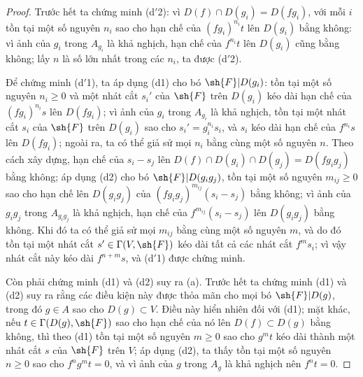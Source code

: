 \documentclass[oneside]{amsart}
\renewcommand{\geq}{\geqslant}
\newcommand{\oldpage}[2][]{{\marginnote{\normalfont\textbf{#1}~|~#2}}\ignorespaces}
\begin{document}
\begin{proof}
Trước hết ta chứng minh (d$'$2): vì $D(f)\cap D(g_i)=D(fg_i)$, với mỗi $i$ tồn tại một số nguyên $n_i$ sao cho hạn chế của $(fg_i)^{n_i}t$ lên $D(g_i)$ bằng không:
vì ảnh của $g_i$ trong $A_{g_i}$ là khả nghịch, hạn chế của $f^{n_i}t$ lên $D(g_i)$ cũng bằng không;
lấy $n$ là số lớn nhất trong các $n_i$, ta được (d$'$2).

Để chứng minh (d$'$1), ta áp dụng (d1) cho bó $\sh{F}|D(g_i)$: tồn tại một số nguyên $n_i\geq 0$ và một nhát cắt $s_i'$ của $\sh{F}$ trên $D(g_i)$ kéo dài hạn chế của $(fg_i)^{n_i}s$ lên $D(fg_i)$;
vì ảnh của $g_i$ trong $A_{g_i}$ là khả nghịch, tồn tại một nhát cắt $s_i$ của $\sh{F}$ trên $D(g_i)$ sao cho $s_i'=g_i^{n_i}s_i$, và $s_i$ kéo dài hạn chế của $f^{n_i}s$ lên $D(fg_i)$;
ngoài ra, ta có thể giả sử mọi $n_i$ bằng cùng một số nguyên $n$.
Theo cách xây dựng, hạn chế của $s_i-s_j$ lên $D(f)\cap D(g_i)\cap D(g_j)=D(fg_i g_j)$ bằng không;
áp dụng (d2) cho bó $\sh{F}|D(g_i g_j)$, tồn tại một số nguyên $m_{ij}\geq 0$ sao cho hạn chế lên $D(g_i g_j)$ của $(fg_i g_j)^{m_{ij}}(s_i-s_j)$ bằng không;
vì ảnh của $g_i g_j$ trong $A_{g_i g_j}$ là khả nghịch, hạn chế của $f^{m_{ij}}(s_i-s_j)$ lên $D(g_i g_j)$ bằng không.
Khi đó ta có thể giả sử mọi $m_{ij}$ bằng cùng một số nguyên $m$, và do đó tồn tại một nhát cắt $s'\in\Gamma(V,\sh{F})$ kéo dài tất cả các nhát cắt $f^m s_i$;
vì vậy nhát cắt này kéo dài $f^{n+m}s$, và (d$'$1) được chứng minh.

Còn phải chứng minh (d1) và (d2) suy ra (a).
Trước hết ta chứng minh (d1) và (d2) suy ra rằng các điều kiện này được thỏa mãn cho mọi bó $\sh{F}|D(g)$, trong đó $g\in A$ sao cho $D(g)\subset V$.
Điều này hiển nhiên đối với (d1);
mặt khác, nếu $t\in\Gamma(D(g),\sh{F})$ sao cho hạn chế của nó lên $D(f)\subset D(g)$ bằng không, thì theo (d1) tồn tại một số nguyên $m\geq 0$ sao cho $g^m t$
\oldpage[I]{92}
kéo dài thành một nhát cắt $s$ của $\sh{F}$ trên $V$;
áp dụng (d2), ta thấy tồn tại một số nguyên $n\geq 0$ sao cho $f^n g^m t=0$, và vì ảnh của $g$ trong $A_g$ là khả nghịch nên $f^n t=0$.


\end{proof}
\end{document}
